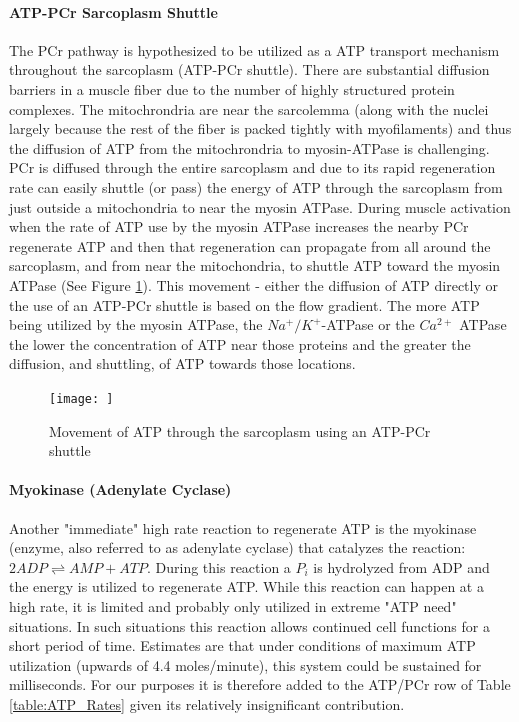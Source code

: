 \paragraph{ATP-PCr Sarcoplasm Shuttle}
The PCr pathway is hypothesized to be utilized as a ATP transport mechanism throughout the sarcoplasm (ATP-PCr shuttle). There are substantial diffusion barriers in a muscle fiber due to the number of highly structured protein complexes. The mitochrondria are near the sarcolemma (along with the nuclei largely because the rest of the fiber is packed tightly with myofilaments) and thus the diffusion of ATP from the mitochrondria to myosin-ATPase is challenging. PCr is diffused through the entire sarcoplasm and due to its rapid regeneration rate can easily shuttle (or pass) the energy of ATP through the sarcoplasm from just outside a mitochondria to near the myosin ATPase. During muscle activation when the rate of ATP use by the myosin ATPase increases the nearby PCr regenerate ATP and then that regeneration can propagate from all around the sarcoplasm, and from near the mitochondria, to shuttle ATP toward the myosin ATPase (See Figure \ref{fig:PCr}). This movement - either the diffusion of ATP directly or the use of an ATP-PCr shuttle is based on the flow gradient. The more ATP being utilized by the myosin ATPase, the $Na^+/K^+$-ATPase or the $Ca^{2+}$ ATPase the lower the concentration of ATP near those proteins and the greater the diffusion, and shuttling, of ATP towards those locations.

\begin{figure}[h!]
    \centering
    \texttt{[image: ]}
    \caption{Movement of ATP through the sarcoplasm using an ATP-PCr shuttle}
    \label{fig:PCr}
\end{figure}

\paragraph{Myokinase (Adenylate Cyclase)}

Another "immediate" high rate reaction to regenerate ATP is the myokinase (enzyme, also referred to as adenylate cyclase) that catalyzes the reaction: $2ADP \rightleftharpoons AMP + ATP$. During this reaction a $P_i$ is hydrolyzed from ADP and the energy is utilized to regenerate ATP. While this reaction can happen at a high rate, it is limited and probably only utilized in extreme "ATP need" situations. In such situations this reaction allows continued cell functions for a short period of time. Estimates are that under conditions of maximum ATP utilization (upwards of 4.4 moles/minute), this system could be sustained for milliseconds. For our purposes it is therefore added to the ATP/PCr row of Table \ref{table:ATP_Rates} given its relatively insignificant contribution.

